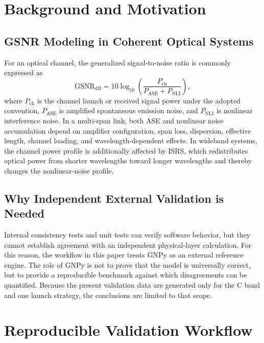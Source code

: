 \documentclass[journal]{IEEEtran}
\begin{document}
\section{Background and Motivation}
\subsection{GSNR Modeling in Coherent Optical Systems}
For an optical channel, the generalized signal-to-noise ratio is commonly expressed as
\begin{equation}
\mathrm{GSNR}_{\mathrm{dB}} = 10\log_{10}\left(\frac{P_{\mathrm{ch}}}{P_{\mathrm{ASE}} + P_{\mathrm{NLI}}}\right),
\label{eq:gsnr}
\end{equation}
where $P_{\mathrm{ch}}$ is the channel launch or received signal power under the adopted convention, $P_{\mathrm{ASE}}$ is amplified spontaneous emission noise, and $P_{\mathrm{NLI}}$ is nonlinear interference noise. In a multi-span link, both ASE and nonlinear noise accumulation depend on amplifier configuration, span loss, dispersion, effective length, channel loading, and wavelength-dependent effects. In wideband systems, the channel power profile is additionally affected by ISRS, which redistributes optical power from shorter wavelengths toward longer wavelengths and thereby changes the nonlinear-noise profile.

\subsection{Why Independent External Validation is Needed}
Internal consistency tests and unit tests can verify software behavior, but they cannot establish agreement with an independent physical-layer calculation. For this reason, the workflow in this paper treats GNPy as an external reference engine. The role of GNPy is not to prove that the model is universally correct, but to provide a reproducible benchmark against which disagreements can be quantified. Because the present validation data are generated only for the C band and one launch strategy, the conclusions are limited to that scope.

\section{Reproducible Validation Workflow}
\end{document}
